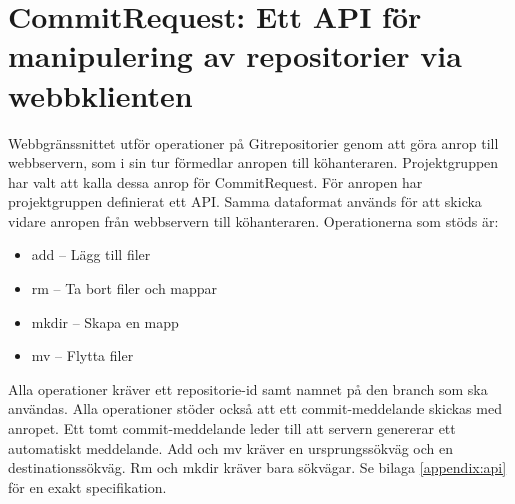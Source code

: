 \section{CommitRequest: Ett API för manipulering av repositorier via webbklienten}
Webbgränssnittet utför operationer på Gitrepositorier genom att göra anrop till webbservern, som i sin tur förmedlar anropen till köhanteraren. Projektgruppen har valt att kalla dessa anrop för CommitRequest.
För anropen har projektgruppen definierat ett API. Samma dataformat används för att skicka vidare anropen från webbservern till köhanteraren.
Operationerna som stöds är:

\begin{itemize}
  
  \item add – Lägg till filer
  \item rm – Ta bort filer och mappar
  \item mkdir – Skapa en mapp
  \item mv – Flytta filer
  
\end{itemize}

Alla operationer kräver ett repositorie-id samt namnet på den branch som ska användas. Alla operationer stöder också att ett commit-meddelande skickas med anropet. Ett tomt commit-meddelande leder till att servern genererar ett automatiskt meddelande. Add och mv kräver en ursprungssökväg och en destinationssökväg. Rm och mkdir kräver bara sökvägar.
Se bilaga \ref{appendix:api} för en exakt specifikation.